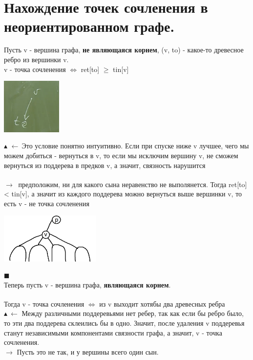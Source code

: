 \setcounter{section}{36}
\section{Нахождение точек сочленения в неориентированном графе.}
Пусть v - вершина графа, \textbf{не являющаяся корнем}, (v, to) - какое-то древесное ребро из вершинки v.\\  v - точка сочленения $\Longleftrightarrow$  ret[to] $\geq$ tin[v]
\begin{center}
    \includegraphics[width=3cm]{images/37_alg22.PNG}
\end{center}
$\blacktriangle$
$\leftarrow \ $Это условие понятно интуитивно. Если при спуске ниже v лучшее, чего мы можем добиться - вернуться в v, то если мы исключим вершину v, не сможем вернуться из поддерева в предков v, а значит, связность нарушится
\\
\\
$\rightarrow \ $ предположим, ни для какого сына неравенство не выполянется. Тогда  ret[to] < tin[v], а значит из каждого поддерева можно вернуться выше вершинки v, то есть v - не точка сочленения
\begin{center}
    \includegraphics[width=5cm]{images/37_alg23.PNG}
\end{center}$\blacksquare \ $ \\
Теперь пусть v - вершина графа, \textbf{являющаяся корнем}. 
\\
\\
Тогда v - точка сочленения $\Longleftrightarrow$ из v выходит хотябы два древесных ребра\\
$\blacktriangle \ \leftarrow$ Между различными поддеревьями нет ребер, так как если бы ребро было, то эти два поддерева склеились бы в одно. Значит, после удаления v поддеревья станут независимыми компонентами связности графа, а значит, v - точка сочленения. \\ $\rightarrow$ Пусть это не так, и у вершины всего один сын.  
